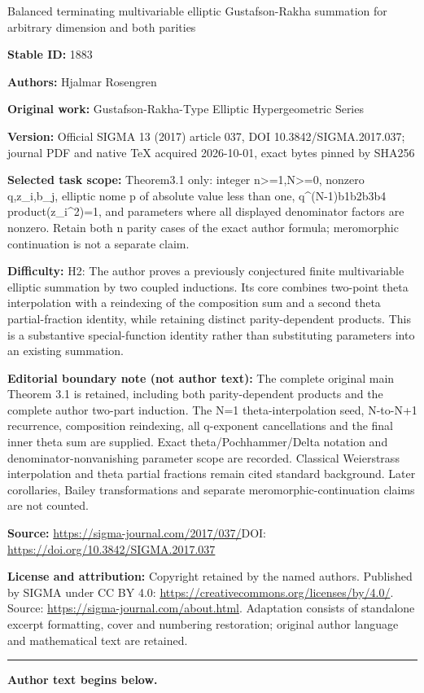 \documentclass[11pt]{article}
\numberwithin{equation}{section}
\begin{document}
\begin{center}\Large Balanced terminating multivariable elliptic Gustafson-Rakha summation for arbitrary dimension and both parities\end{center}
\noindent\textbf{Stable ID:} 1883\par
\noindent\textbf{Authors:} Hjalmar Rosengren\par
\noindent\textbf{Original work:} Gustafson-Rakha-Type Elliptic Hypergeometric Series\par
\noindent\textbf{Version:} Official SIGMA 13 (2017) article 037, DOI 10.3842/SIGMA.2017.037; journal PDF and native TeX acquired 2026-10-01, exact bytes pinned by SHA256\par
\noindent\textbf{Selected task scope:} Theorem3.1 only: integer n>=\allowbreak{}1,N>=\allowbreak{}0, nonzero q,z\_i,b\_j, elliptic nome p of absolute value less than one, q\textasciicircum{}(N-1)b1b2b3b4 product(z\_i\textasciicircum{}2)=\allowbreak{}1, and parameters where all displayed denominator factors are nonzero. Retain both n parity cases of the exact author formula; meromorphic continuation is not a separate claim.\par
\noindent\textbf{Difficulty:} H2: The author proves a previously conjectured finite multivariable elliptic summation by two coupled inductions. Its core combines two-point theta interpolation with a reindexing of the composition sum and a second theta partial-fraction identity, while retaining distinct parity-dependent products. This is a substantive special-function identity rather than substituting parameters into an existing summation.\par
\noindent\textbf{Editorial boundary note (not author text):} The complete original main Theorem 3.1 is retained, including both parity-dependent products and the complete author two-part induction. The N=\allowbreak{}1 theta-interpolation seed, N-to-N+\allowbreak{}1 recurrence, composition reindexing, all q-exponent cancellations and the final inner theta sum are supplied. Exact theta/Pochhammer/Delta notation and denominator-nonvanishing parameter scope are recorded. Classical Weierstrass interpolation and theta partial fractions remain cited standard background. Later corollaries, Bailey transformations and separate meromorphic-continuation claims are not counted.\par
\noindent\textbf{Source:} \url{https://sigma-journal.com/2017/037/}\quad DOI: \url{https://doi.org/10.3842/SIGMA.2017.037}\par
\noindent\textbf{License and attribution:} Copyright retained by the named authors. Published by SIGMA under CC BY 4.0: \url{https://creativecommons.org/licenses/by/4.0/}. Source: \url{https://sigma-journal.com/about.html}. Adaptation consists of standalone excerpt formatting, cover and numbering restoration; original author language and mathematical text are retained.\par
\medskip\hrule\medskip\noindent\textbf{Author text begins below.}\par
\setcounter{section}{1}
\setcounter{subsection}{0}
\setcounter{subsubsection}{0}
\setcounter{Theorem}{0}
\setcounter{equation}{1}
\end{document}
